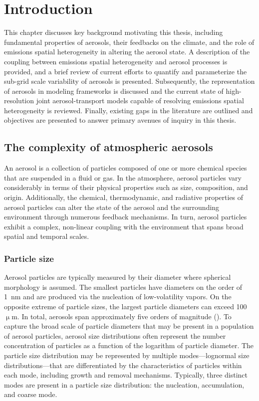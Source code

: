 \chapter{Introduction}

This chapter discusses key background motivating this thesis, including fundamental properties of aerosols, their feedbacks on the climate, and the role of emissions spatial heterogeneity in altering the aerosol state. A description of the coupling between emissions spatial heterogeneity and aerosol processes is provided, and a brief review of current efforts to quantify and parameterize the sub-grid scale variability of aerosols is presented. Subsequently, the representation of aerosols in modeling frameworks is discussed and the current state of high-resolution joint aerosol-transport models capable of resolving emissions spatial heterogeneity is reviewed. Finally, existing gaps in the literature are outlined and objectives are presented to answer primary avenues of inquiry in this thesis. 

\section{The complexity of atmospheric aerosols}\label{aerosol_properties}

An aerosol is a collection of particles composed of one or more chemical species that are suspended in a fluid or gas. In the atmosphere, aerosol particles vary considerably in terms of their physical properties such as size, composition, and origin. Additionally, the chemical, thermodynamic, and radiative properties of aerosol particles can alter the state of the aerosol and the surrounding environment through numerous feedback mechanisms. In turn, aerosol particles exhibit a complex, non-linear coupling with the environment that spans broad spatial and temporal scales.

\subsection{Particle size}
Aerosol particles are typically measured by their diameter where spherical morphology is assumed. The smallest particles have diameters on the order of 1~nm and are produced via the nucleation of low-volatility vapors. On the opposite extreme of particle sizes, the largest particle diameters can exceed 100~$\upmu$m. In total, aerosols span approximately five orders of magnitude (\cite{seinfeld_atmospheric_1998}). To capture the broad scale of particle diameters that may be present in a population of aerosol particles, aerosol size distributions often represent the number concentration of particles as a function of the logarithm of particle diameter. The particle size distribution may be represented by multiple modes---lognormal size distributions---that are differentiated by the characteristics of particles within each mode, including growth and removal mechanisms. Typically, three distinct modes are present in a particle size distribution: the nucleation, accumulation, and coarse mode. 

